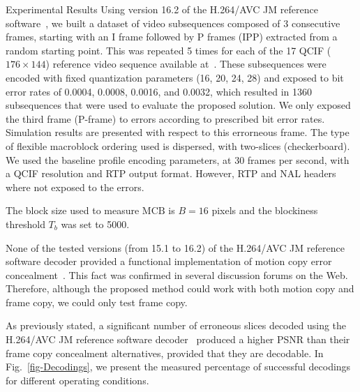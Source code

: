 \documentclass{article}
\newcommand{\ltCodec}{H.264/AVC JM reference software}
\begin{document}
\vspace{-1.5em}\begin{section}{Experimental Results}
\label{section-experimental-results}
Using version 16.2 of the \ltCodec~\cite{JM}, we built a dataset of video
subsequences composed of 3 consecutive frames, starting with an I frame followed
by P frames (IPP) extracted from a random starting point. This was repeated 5 
times for each of the 17 QCIF ($176\times{}144$) reference video sequence 
available 
at~\cite{YUV}. These
subsequences were encoded with fixed quantization parameters (16, 20, 24, 28)
and exposed to bit error rates of 0.0004, 0.0008, 0.0016, and 0.0032, which
resulted in 1360 subsequences that were used to evaluate the proposed solution.
We only exposed the third frame (P-frame) to errors according to prescribed bit 
error rates. Simulation results are presented with respect to this errorneous 
frame.
The type of flexible macroblock ordering used is dispersed, with two-slices 
(checkerboard). 
We used the baseline profile encoding parameters, at
30 frames per second, with a QCIF resolution and RTP output
format. However, RTP and NAL headers where not exposed to the errors.

The block size used to measure $\textrm{MCB}$ is \mbox{$B\!=\!16$} pixels and 
the blockiness threshold $T_b$ was set to 5000.

None of the tested versions (from 15.1 to 16.2) of the \ltCodec{} decoder 
provided a functional implementation of motion copy error
concealment~\cite{BUG}. This fact was confirmed in several discussion forums
on the Web. Therefore, although the proposed method could work with both
motion copy and frame copy, we could only test frame copy.

As previously stated, a significant number of erroneous slices decoded using 
the \ltCodec{} decoder~\cite{JM} produced a higher PSNR than their frame copy
concealment alternatives, provided that they are decodable. In 
Fig.~\ref{fig-Decodings}, we present the measured 
percentage of successful decodings for different operating conditions. 


\end{section}
\end{document}
